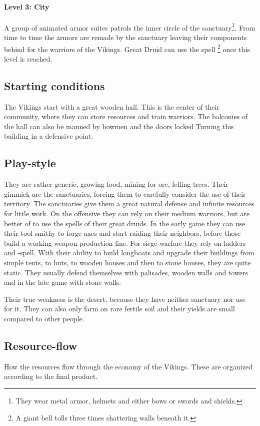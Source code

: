 \documentclass[a4paper]{book}
\begin{document}
			\paragraph{Level 3: City}
				A group of animated armor suites patrols the inner circle of the sanctuary\footnote{
					They wear metal armor, helmets and either bows or swords and shields.
				}.
				From time to time the armors are remade by the sanctuary leaving their
				components behind for the warriors of the \gls{Vikings}.
				Great Druid can use the spell \footnote{
					A giant bell tolls three times shattering walls beneath it.
				} once this level is reached.

	\subsection{Starting conditions}
		The \gls{Vikings} start with a great wooden hall.
		This is the center of their community, where they can store resources
		and train warriors.
		The balconies of the hall can also be manned by bowmen and the doors locked
		Turning this building in a defensive point.

	\subsection{Play-style}
		They are rather generic, growing food, mining for ore, felling trees.
		Their gimmick are the sanctuaries, forcing them to carefully consider the use of their territory.
		The sanctuaries give them a great natural defense and infinite resources for little work.
		On the offensive they can rely on their medium warriors,
		but are better of to use the spells of their great druids.
		In the early game they can use their tool-smithy to forge axes and start raiding their neighbors,
		before those build a working weapon production line.
		For siege-warfare they rely on ladders and -spell.
		With their ability to build longboats and upgrade their buildings from simple tents,
		to huts, to wooden houses  and then to stone houses, they are quite static.
		They usually defend themselves with palisades, wooden walls and towers and in the
		late game with stone walls.

		Their true weakness is the desert, because they have neither sanctuary nor use for it.
		They can also only farm on rare fertile soil and their yields are small compared to
		other people.

	\subsection{Resource-flow}
		How the resources flow through the economy of the \gls{Vikings}.
		These are organized according to the final product.
\end{document}
